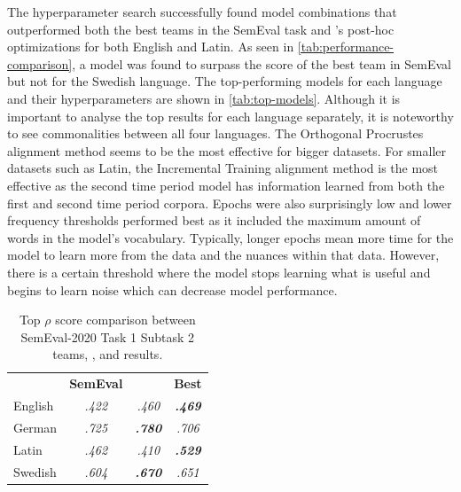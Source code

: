 The hyperparameter search successfully found model combinations that outperformed both the best teams in the SemEval task and \citet{kaiser-etal-2020-ims}’s post-hoc optimizations for both English and Latin. As seen in \autoref{tab:performance-comparison}, a model was found to surpass the score of the best team in SemEval but not \citet{kaiser-etal-2020-ims} for the Swedish language. The top-performing models for each language and their hyperparameters are shown in \autoref{tab:top-models}. Although it is important to analyse the top results for each language separately, it is noteworthy to see commonalities between all four languages. The Orthogonal Procrustes alignment method seems to be the most effective for bigger datasets. For smaller datasets such as Latin, the Incremental Training alignment method is the most effective as the second time period model has information learned from both the first and second time period corpora. Epochs were also surprisingly low and lower frequency thresholds performed best as it included the maximum amount of words in the model’s vocabulary. Typically, longer epochs mean more time for the model to learn more from the data and the nuances within that data. However, there is a certain threshold where the model stops learning what is useful and begins to learn noise which can decrease model performance. 


\begin{table}[h]
\centering
\begin{tabular}{lccc} 
\toprule
\textbf{ } & \textbf{SemEval } & \textbf{\citet{kaiser-etal-2020-ims} }         & \textbf{Best }            \\
English    & \textit{ .422 }   & \textit{ .460 }          & \textbf{\textit{ .469 }}  \\
German     & \textit{ .725 }   & \textit{\textbf{ .780 }} & \textit{ .706 }           \\
Latin      & \textit{ .462 }   & \textit{ .410 }          & \textbf{\textit{ .529 }}  \\
Swedish    & \textit{ .604 }   & \textit{\textbf{ .670 }} & \textit{ .651 }           \\
\bottomrule
\end{tabular}
\caption{Top $\rho$ score comparison between SemEval-2020 Task 1 Subtask 2 teams, \citet{kaiser-etal-2020-ims}, and results.}
\label{tab:performance-comparison}
\end{table}


